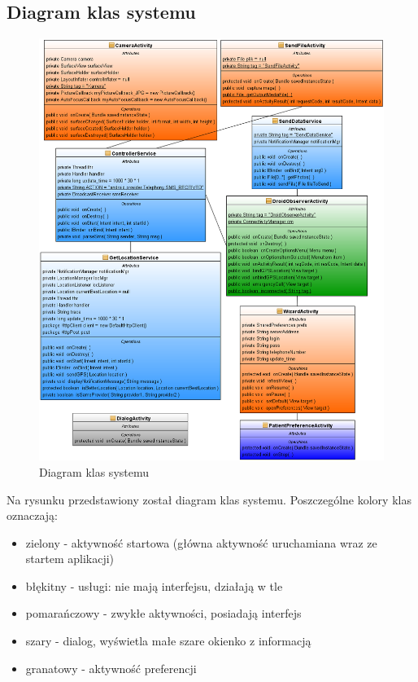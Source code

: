 \documentclass[11pt,a4paper]{article}
\begin{document}
\subsection {Diagram klas systemu}
  \begin{figure}[h]
    \includegraphics[scale=0.4]{class_diagram.png}
    \caption{Diagram klas systemu}
  \end{figure}
Na rysunku przedstawiony został diagram klas systemu. Poszczególne kolory klas oznaczają:
\begin{itemize}
\item zielony - aktywność startowa (główna aktywność uruchamiana wraz ze startem aplikacji)
\item błękitny - usługi: nie mają interfejsu, działają w tle
\item pomarańczowy - zwykłe aktywności, posiadają interfejs
\item szary - dialog, wyświetla małe szare okienko z informacją
\item granatowy - aktywność preferencji
\end{itemize}
\end{document}
